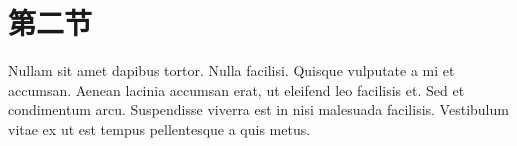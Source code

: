 \documentclass[float=false, crop=false]{standalone}
\begin{document}
    
    \section{第二节}
    Nullam sit amet dapibus tortor.
Nulla facilisi. Quisque vulputate a mi et accumsan.
Aenean lacinia accumsan erat, ut eleifend leo facilisis et.
Sed et condimentum arcu.
Suspendisse viverra est in nisi malesuada facilisis.
Vestibulum vitae ex ut est tempus pellentesque a quis metus.
\end{document}
